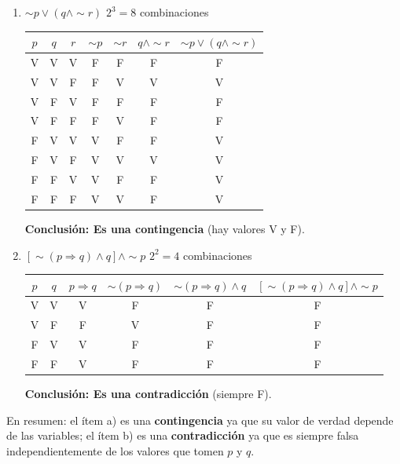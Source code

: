 \documentclass[12pt]{article}
\begin{document}
\begin{enumerate}[label=\alph*.-]
    \item $\sim p \vee (q \wedge \sim r)$ \quad $2^3 = 8$ combinaciones

    \begin{center}
    \begin{tabular}{ccc|c|c|c|c}
        \toprule
        $p$ & $q$ & $r$ & $\sim p$ & $\sim r$ & $q \wedge \sim r$ & $\sim p \vee (q \wedge \sim r)$ \\
        \midrule
        V & V & V & F & F & F & F \\
        V & V & F & F & V & V & V \\
        V & F & V & F & F & F & F \\
        V & F & F & F & V & F & F \\
        F & V & V & V & F & F & V \\
        F & V & F & V & V & V & V \\
        F & F & V & V & F & F & V \\
        F & F & F & V & V & F & V \\
        \bottomrule
    \end{tabular}
    \end{center}
    \textbf{Conclusión: Es una contingencia} (hay valores V y F).

    \item $[\sim(p \Rightarrow q) \wedge q] \wedge \sim p$ \quad $2^2 = 4$ combinaciones

    \begin{center}
    \begin{tabular}{cc|c|c|c|c}
        \toprule
        $p$ & $q$ & $p \Rightarrow q$ & $\sim(p \Rightarrow q)$ & $\sim(p \Rightarrow q) \wedge q$ & $[\sim(p \Rightarrow q) \wedge q] \wedge \sim p$ \\
        \midrule
        V & V & V & F & F & F \\
        V & F & F & V & F & F \\
        F & V & V & F & F & F \\
        F & F & V & F & F & F \\
        \bottomrule
    \end{tabular}
    \end{center}
    \textbf{Conclusión: Es una contradicción} (siempre F).
\end{enumerate}

En resumen: el ítem a) es una \textbf{contingencia} ya que su valor de verdad depende de las variables; el ítem b) es una \textbf{contradicción} ya que es siempre falsa independientemente de los valores que tomen $p$ y $q$.
\end{document}
